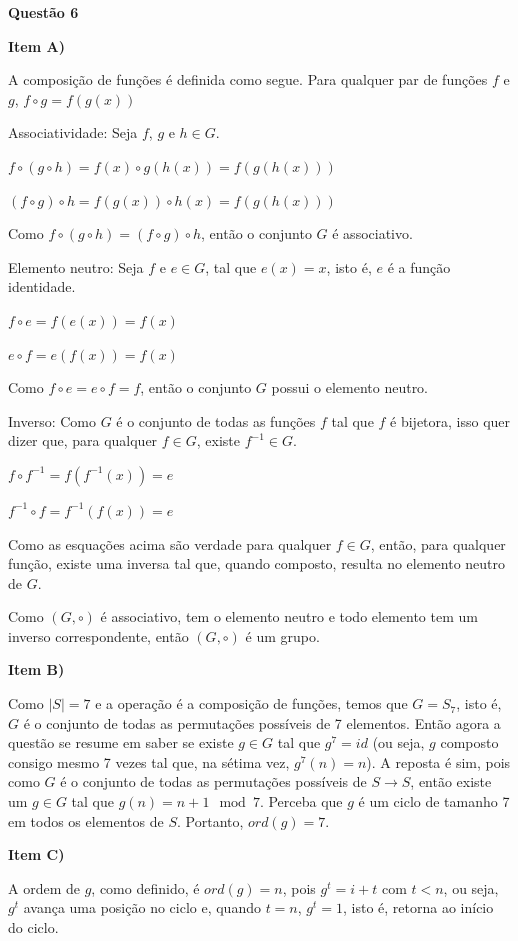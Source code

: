 \documentclass{article}
\begin{document}
\textbf{Questão 6}

\textbf{Item A)}

    A composição de funções é definida como segue. Para qualquer par de funções $f$ e $g$, $f \circ g = f(g(x))$

    Associatividade: Seja $f$, $g$ e $h \in G$.

    $f \circ (g \circ h) = f(x) \circ g(h(x)) = f(g(h(x)))$

    $(f \circ g) \circ h = f(g(x)) \circ h(x) = f(g(h(x)))$

    Como $f \circ (g \circ h) = (f \circ g) \circ h$, então o conjunto $G$ é associativo.

    Elemento neutro: Seja $f$ e $e \in G$, tal que $e(x) = x$, isto é, $e$ é a função identidade.

    $f \circ e = f(e(x)) = f(x)$

    $e \circ f = e(f(x)) = f(x)$

    Como $f \circ e = e \circ f = f$, então o conjunto $G$ possui o elemento neutro.

    Inverso: Como $G$ é o conjunto de todas as funções $f$ tal que $f$ é bijetora, isso quer dizer que, para qualquer $f \in G$, existe $f^{-1} \in G$.

    $f \circ f^{-1} = f(f^{-1}(x)) = e$

    $f^{-1} \circ f = f^{-1}(f(x)) = e$

    Como as esquações acima são verdade para qualquer $f \in G$, então, para qualquer função, existe uma inversa tal que, quando composto, resulta no elemento neutro de $G$.

    Como $(G, \circ)$ é associativo, tem o elemento neutro e todo elemento tem um inverso correspondente, então $(G, \circ)$ é um grupo.

\textbf{Item B)}

    Como $|S| = 7$ e a operação é a composição de funções, temos que $G = S_7$, isto é, $G$ é o conjunto de todas as permutações possíveis de 7 elementos. Então agora a questão se resume em saber se existe $g \in G$ tal que $g^7 = id$ (ou seja, $g$ composto consigo mesmo 7 vezes tal que, na sétima vez, $g^7(n) = n$). A reposta é sim, pois como $G$ é o conjunto de todas as permutações possíveis de $S \rightarrow S$, então existe um $g \in G$ tal que $g(n) = n + 1 \mod 7$. Perceba que $g$ é um ciclo de tamanho 7 em todos os elementos de $S$. Portanto, $ord(g) = 7$. 

\textbf{Item C)}

    A ordem de $g$, como definido, é $ord(g) = n$, pois $g^t = i + t$ com $t < n$, ou seja, $g^t$ avança uma posição no ciclo e, quando $t = n$, $g^t = 1$, isto é, retorna ao início do ciclo.
\end{document}
